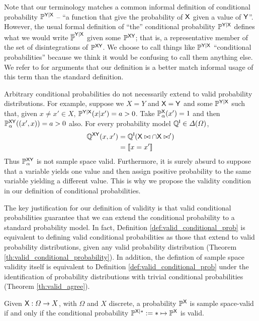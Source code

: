 Note that our terminology matches a common informal definition of conditional probability $\prob{P}^{\RV{Y}|\RV{X}}$ -- ``a function that give the probability of $\RV{X}$ given a value of $\RV{Y}$''. However, the usual formal definition of ``the'' conditional probability $\prob{P}^{\RV{Y}|\RV{X}}$ defines what we would write $\overline{\prob{P}}^{\RV{Y}|\RV{X}}$ given some $\prob{P}^{\RV{XY}}$; that is, a representative member of the set of disintegrations of $\prob{P}^{\RV{XY}}$. We choose to call things like $\prob{P}^{\RV{Y}|\RV{X}}$ ``conditional probabilities'' because we think it would be confusing to call them anything else. We refer to \citet{hajek_what_2003} for arguments that our definition is a better match informal usage of this term than the standard definition.

Arbitrary conditional probabilities do not necessarily extend to valid probability distributions. For example, suppose we $X=Y$ and $\RV{X}=\RV{Y}$ and some $\prob{P}^{\RV{Y}|\RV{X}}$ such that, given $x\neq x'\in X$, $\prob{P}^{\RV{Y}|\RV{X}}(x|x')=a>0$. Take $\prob{P}_\alpha^{\RV{X}}(x')=1$ and then $\prob{P}_\alpha^{\RV{XY}}((x',x))=a>0$ also. For every probability model $\prob{Q}^{\RV{I}}\in \Delta(\Omega)$,
\begin{align}
\prob{Q}^{\RV{XY}}(x,x')&=\prob{Q}^{\RV{I}}(\RV{X}\yields x\cap\RV{X}\yields x')\\
&= \llbracket x=x' \rrbracket
\end{align}
Thus $\prob{P}_\alpha^{\RV{XY}}$ is not sample space valid. Furthermore, it is surely absurd to suppose that a variable yields one value and then assign positive probability to the same variable yielding a different value. This is why we propose the validity condition in our definition of conditional probabilities.

The key justification for our definition of validity is that valid conditional probabilities guarantee that we can extend the conditional probability to a standard probability model. In fact, Definition \ref{def:valid_conditional_prob} is equivalent to defining valid conditional probabilities as those that extend to valid probability distributions, given any valid probability distribution (Theorem \ref{th:valid_conditional_probability}). In addition, the defintion of sample space validity itself is equivalent to Definition \ref{def:valid_conditional_prob} under the identification of probability distributions with trivial conditional probabilities (Theorem \ref{th:valid_agree}).

\begin{theorem}\label{th:valid_agree}
Given $\RV{X}:\Omega\to X$, with $\Omega$ and $X$ discrete, a probability $\prob{P}^{\RV{X}}$ is sample space-valid if and only if the conditional probability $\prob{P}^{\RV{X}|*}:=*\mapsto \prob{P}^{\RV{X}}$ is valid.
\end{theorem}

